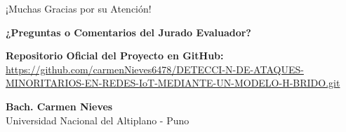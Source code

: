 \documentclass[10pt, aspectratio=169]{beamer}
\begin{document}
\begin{frame}{¡Muchas Gracias por su Atención!}
\begin{center}
  \Large \textbf{¿Preguntas o Comentarios del Jurado Evaluador?}
  
  \vspace{1cm}
  \normalsize
  \textbf{Repositorio Oficial del Proyecto en GitHub:} \\
  \small \url{https://github.com/carmenNieves6478/DETECCI-N-DE-ATAQUES-MINORITARIOS-EN-REDES-IoT-MEDIANTE-UN-MODELO-H-BRIDO.git}
  
  \vspace{0.8cm}
  \small \textbf{Bach. Carmen Nieves} \\
  Universidad Nacional del Altiplano - Puno
\end{center}
\end{frame}
\end{document}
